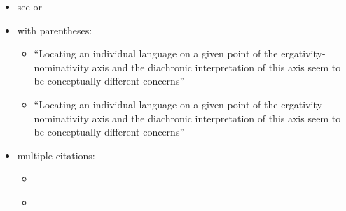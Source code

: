 \documentclass{article}
\begin{document}
\begin{itemize}
\tightlist
\item
  see \textcites{alvarez1998split} or
  \textcites[133-134]{alvarez1998split}
\item
  with parentheses:

  \begin{itemize}
  \tightlist
  \item
    ``Locating an individual language on a given point of the
    ergativity-nominativity axis and the diachronic interpretation of
    this axis seem to be conceptually different concerns''
    \parencites{alvarez1998split}
  \item
    ``Locating an individual language on a given point of the
    ergativity-nominativity axis and the diachronic interpretation of
    this axis seem to be conceptually different concerns''
    \parencites[71]{alvarez1998split}
  \end{itemize}
\item
  multiple citations:

  \begin{itemize}
  \tightlist
  \item
    \textcites[133-134]{alvarez1998split}[218]{triomeira1999}
  \item
    \parencites[133-134]{alvarez1998split}[218]{triomeira1999}
  \end{itemize}
\end{itemize}

\printbibliography
\end{document}

